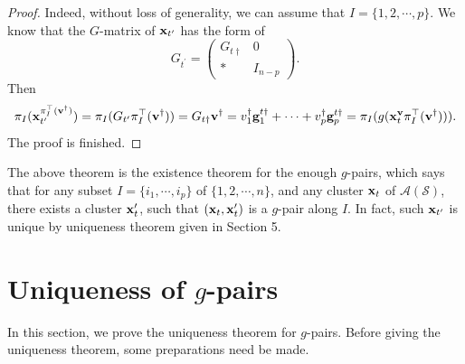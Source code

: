 \documentclass[14pt]{amsart}
\begin{document}
\begin{proof}
 Indeed, without loss of generality, we can assume that $I=\{1,2,\cdots,p\}$. We know that the $G$-matrix of ${\bf x}_{t^{\prime}}$ has the form of $$G_{t^{\prime}}=\begin{pmatrix}G_{t\dag}&0\\\ast&I_{n-p}\end{pmatrix}.$$
Then
 $$\pi_I({\bf x}_{t^{\prime}}^{\pi_I^{\top}({\bf v}^{\dag})})=\pi_I(G_{t^\prime}\pi_I^{\top}({\bf v}^{\dag}))= G_{t\dag}{\bf v}^{\dag} =v_1^{\dag}{\bf g}_1^{t\dag}+\cdots+v_p^{\dag}{\bf g}_p^{t\dag}=\pi_I(g({\bf x}_t^{\bf v}\pi_I^{\top}({\bf v}^{\dag}))).$$
 The proof is finished.
\end{proof}
The above theorem is the existence theorem for the enough $g$-pairs, which says that for any subset $I=\{i_1,\cdots,i_p\}$ of $\{1,2,\cdots,n\}$, and any cluster ${\bf x}_t$ of $\mathcal A(\mathcal S)$, there exists a cluster ${\bf x}_t^\prime$, such that $({\bf x}_t,{\bf x}_t^\prime)$ is a $g$-pair along $I$.
In fact, such ${\bf x}_{t^{\prime}}$ is unique by uniqueness theorem given in Section 5.

\vspace{5mm}


\section{Uniqueness  of $g$-pairs}
In this section, we prove the uniqueness theorem for $g$-pairs. Before giving the uniqueness theorem, some preparations need be made.
\end{document}
